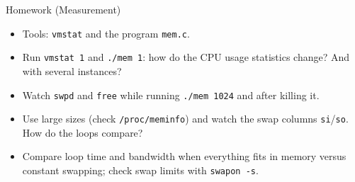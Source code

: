 \begin{frame}{Homework (Measurement)}

\begin{itemize}
    \item Tools: \texttt{vmstat} and the program \texttt{mem.c}.
    \item Run \texttt{vmstat 1} and \texttt{./mem 1}: how do the CPU usage
          statistics change? And with several instances?
    \item Watch \texttt{swpd} and \texttt{free} while running
          \texttt{./mem 1024} and after killing it.
    \item Use large sizes (check \texttt{/proc/meminfo}) and watch the swap
          columns \texttt{si}/\texttt{so}. How do the loops compare?
    \item Compare loop time and bandwidth when everything fits in memory
          versus constant swapping; check swap limits with \texttt{swapon -s}.
\end{itemize}

\end{frame}
